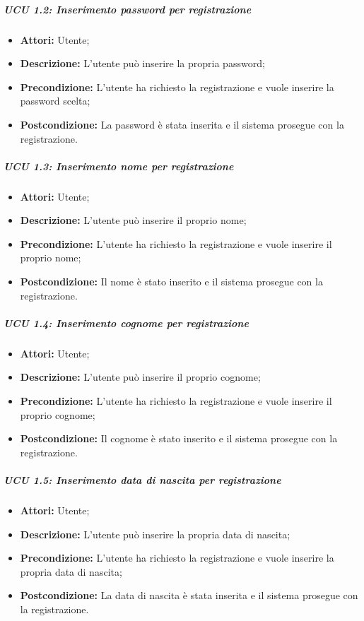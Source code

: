 \subparagraph{UCU 1.2: Inserimento password per registrazione}
\begin{itemize}
	\item \textbf{Attori:} Utente;
	\item \textbf{Descrizione:} L'utente può inserire la propria password;
	\item \textbf{Precondizione:} L'utente ha richiesto la registrazione e vuole inserire la password scelta;
	\item \textbf{Postcondizione:} La password è stata inserita e il sistema prosegue con la registrazione.
\end{itemize}

\subparagraph{UCU 1.3: Inserimento nome per registrazione}
\begin{itemize}
	\item \textbf{Attori:} Utente;
	\item \textbf{Descrizione:} L'utente può inserire il proprio nome;
	\item \textbf{Precondizione:} L'utente ha richiesto la registrazione e vuole inserire il proprio nome;
	\item \textbf{Postcondizione:} Il nome è stato inserito e il sistema prosegue con la registrazione.
\end{itemize}

\subparagraph{UCU 1.4: Inserimento cognome per registrazione}
\begin{itemize}
	\item \textbf{Attori:} Utente;
	\item \textbf{Descrizione:} L'utente può inserire il proprio cognome;
	\item \textbf{Precondizione:} L'utente ha richiesto la registrazione e vuole inserire il proprio cognome;
	\item \textbf{Postcondizione:} Il cognome è stato inserito e il sistema prosegue con la registrazione.
\end{itemize}

\subparagraph{UCU 1.5: Inserimento data di nascita per registrazione}
\begin{itemize}
	\item \textbf{Attori:} Utente;
	\item \textbf{Descrizione:} L'utente può inserire la propria data di nascita;
	\item \textbf{Precondizione:} L'utente ha richiesto la registrazione e vuole inserire la propria data di nascita;
	\item \textbf{Postcondizione:} La data di nascita è stata inserita e il sistema prosegue con la registrazione.
\end{itemize}

